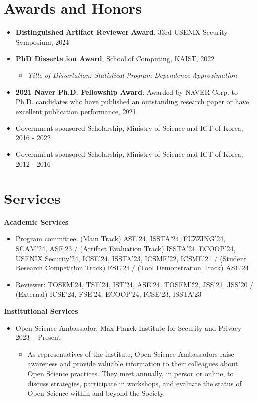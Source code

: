 \documentclass[letterpaper,11pt]{article}
\begin{document}
\section{Awards and Honors}
\begin{itemize}
  \item \textbf{Distinguished Artifact Reviewer Award}, 33rd USENIX Security Symposium, 2024
  \item \textbf{PhD Dissertation Award}, School of Computing, KAIST, 2022
        \vspace{-5pt}\begin{itemize}
          \item \emph{Title of Dissertation: Statistical Program Dependence Approximation}
        \end{itemize}
  \item \textbf{2021 Naver Ph.D. Fellowship Award}: Awarded by NAVER Corp. to Ph.D. candidates who have published an outstanding research paper or have excellent publication performance, 2021
  \item Government-sponsored Scholarship, Ministry of Science and ICT of Korea, 2016 - 2022
  \item Government-sponsored Scholarship, Ministry of Science and ICT of Korea, 2012 - 2016
\end{itemize}

\section{Services}
\textbf{Academic Services}\vspace{-4pt}
\begin{itemize}
  \item Program committee: (Main Track) ASE'24, ISSTA'24, FUZZING'24, SCAM'24, ASE'23 / (Artifact Evaluation Track) ISSTA'24, ECOOP'24, USENIX Security'24, ICSE'24, ISSTA'23, ICSME'22, ICSME'21 / (Student Research Competition Track) FSE'24 / (Tool Demonstration Track) ASE'24
  \item Reviewer: TOSEM'24, TSE'24, IST'24, ASE'24, TOSEM'22, JSS'21, JSS'20  / (External) ICSE'24, FSE'24, ECOOP'24, ICSE'23, ISSTA'23
\end{itemize}

\textbf{Institutional Services}\vspace{-4pt}
\begin{itemize}
  \item Open Science Ambassador, Max Planck Institute for Security and Privacy \hfill   2023 -- Present  \vspace{-6pt}
  \begin{itemize}[leftmargin=.5cm]
    \item[] As representatives of the institute, Open Science Ambassadors raise awareness and provide valuable information to their colleagues about Open Science practices. They meet annually, in person or online, to discuss strategies, participate in workshops, and evaluate the status of Open Science within and beyond the Society.
  \end{itemize}
\end{itemize}
\end{document}

